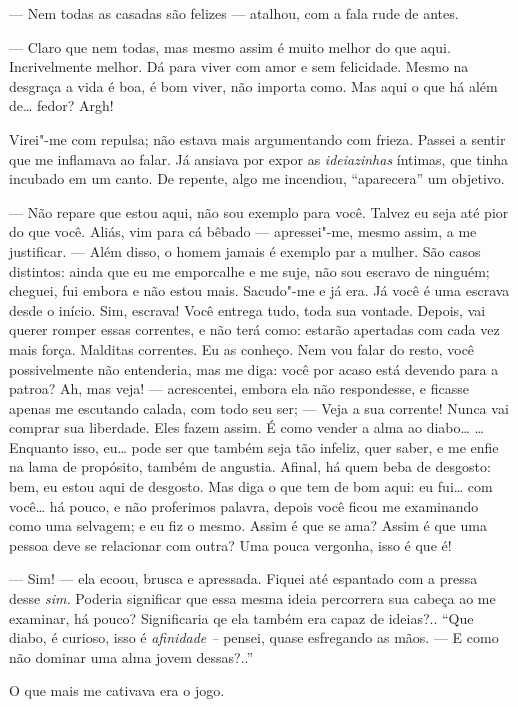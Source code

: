 --- Nem todas as casadas são felizes --- atalhou, com a fala rude de antes.

--- Claro que nem todas, mas mesmo assim é muito melhor do que aqui.
Incrivelmente melhor. Dá para viver com amor e sem felicidade. Mesmo na
desgraça a vida é boa, é bom viver, não importa como. Mas aqui o que há
além de\ldots{} fedor? Argh!

Virei"-me com repulsa; não estava mais argumentando com frieza. Passei a
sentir que me inflamava ao falar. Já ansiava por expor as
\emph{ideiazinhas} íntimas, que tinha incubado em um canto. De repente,
algo me incendiou, ``aparecera'' um objetivo.

--- Não repare que estou aqui, não sou exemplo para você. Talvez eu seja
até pior do que você. Aliás, vim para cá bêbado --- apressei"-me, mesmo
assim, a me justificar. --- Além disso, o homem jamais é exemplo par a
mulher. São casos distintos: ainda que eu me emporcalhe e me suje, não
sou escravo de ninguém; cheguei, fui embora e não estou mais. Sacudo"-me
e já era. Já você é uma escrava desde o início. Sim, escrava! Você
entrega tudo, toda sua vontade. Depois, vai querer romper essas
correntes, e não terá como: estarão apertadas com cada vez mais força.
Malditas correntes. Eu as conheço. Nem vou falar do resto, você
possivelmente não entenderia, mas me diga: você por acaso está devendo
para a patroa? Ah, mas veja! --- acrescentei, embora ela não respondesse,
e ficasse apenas me escutando calada, com todo seu ser; --- Veja a sua
corrente! Nunca vai comprar sua liberdade. Eles fazem assim. É como
vender a alma ao diabo\ldots{} \ldots{}Enquanto isso, eu\ldots{} pode ser que
também seja tão infeliz, quer saber, e me enfie na lama de propósito,
também de angustia. Afinal, há quem beba de desgosto: bem, eu estou aqui
de desgosto. Mas diga o que tem de bom aqui: eu fui\ldots{} com você\ldots{} há
pouco, e não proferimos palavra, depois você ficou me examinando como
uma selvagem; e eu fiz o mesmo. Assim é que se ama? Assim é que uma
pessoa deve se relacionar com outra? Uma pouca vergonha, isso é que é!

--- Sim! --- ela ecoou, brusca e apressada. Fiquei até espantado com a
pressa desse \emph{sim.} Poderia significar que essa mesma ideia
percorrera sua cabeça ao me examinar, há pouco? Significaria qe ela
também era capaz de ideias?.. ``Que diabo, é curioso, isso é
\emph{afinidade --} pensei, quase esfregando as mãos. --- E como não
dominar uma alma jovem dessas?..''

O que mais me cativava era o jogo.

